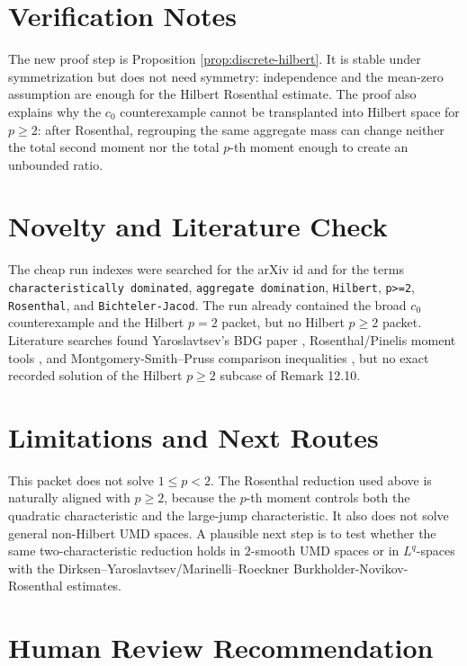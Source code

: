 \documentclass[11pt]{article}
\begin{document}
\section*{Verification Notes}

The new proof step is Proposition \ref{prop:discrete-hilbert}.  It is stable
under symmetrization but does not need symmetry: independence and the mean-zero
assumption are enough for the Hilbert Rosenthal estimate.  The proof also
explains why the \(c_0\) counterexample cannot be transplanted into Hilbert
space for \(p\geq2\): after Rosenthal, regrouping the same aggregate mass can
change neither the total second moment nor the total \(p\)-th moment enough to
create an unbounded ratio.

\section*{Novelty and Literature Check}

The cheap run indexes were searched for the arXiv id and for the terms
\texttt{characteristically dominated}, \texttt{aggregate domination},
\texttt{Hilbert}, \texttt{p>=2}, \texttt{Rosenthal}, and
\texttt{Bichteler-Jacod}.  The run already contained the broad \(c_0\)
counterexample and the Hilbert \(p=2\) packet, but no Hilbert \(p\geq2\)
packet.  Literature searches found Yaroslavtsev's BDG paper
\cite{Yaroslavtsev2018}, Rosenthal/Pinelis moment tools
\cite{Pinelis2012}, and Montgomery-Smith--Pruss comparison inequalities
\cite{MontgomerySmithPruss2001}, but no exact recorded solution of the Hilbert
\(p\geq2\) subcase of Remark 12.10.

\section*{Limitations and Next Routes}

This packet does not solve \(1\leq p<2\).  The Rosenthal reduction used above
is naturally aligned with \(p\geq2\), because the \(p\)-th moment controls both
the quadratic characteristic and the large-jump characteristic.  It also does
not solve general non-Hilbert UMD spaces.  A plausible next step is to test
whether the same two-characteristic reduction holds in \(2\)-smooth UMD spaces
or in \(L^q\)-spaces with the Dirksen--Yaroslavtsev/Marinelli--Roeckner
Burkholder-Novikov-Rosenthal estimates.

\section*{Human Review Recommendation}
\end{document}
